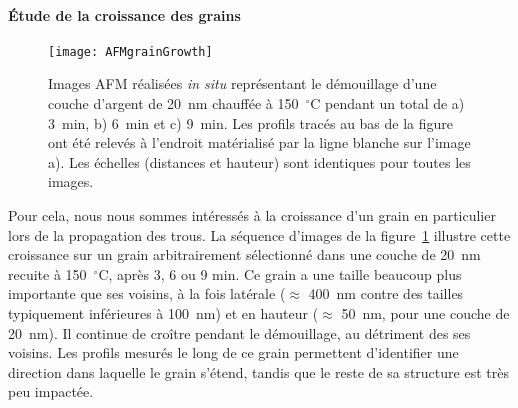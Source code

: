 \paragraph*{Étude de la croissance des grains}
\begin{figure}[h]
	\centering
	\texttt{[image: AFMgrainGrowth]}
	\caption{Images AFM réalisées \textit{in situ} représentant le démouillage d'une couche d'argent de 20~nm chauffée à 150~$^\circ$C pendant un total de a) 3~min, b) 6~min et c) 9~min. Les profils tracés au bas de la figure ont été relevés à l'endroit matérialisé par la ligne blanche sur l'image a). Les échelles (distances et hauteur) sont identiques pour toutes les images.}
	\label{AFMgrainGrowth}
\end{figure}

Pour cela, nous nous sommes intéressés à la croissance d'un grain en particulier lors de la propagation des trous. La séquence d'images de la figure~\ref{AFMgrainGrowth} illustre cette croissance sur un grain arbitrairement sélectionné dans une couche de 20~nm recuite à 150~$^\circ$C, après 3, 6 ou 9 min. Ce grain a une taille beaucoup plus importante que ses voisins, à la fois latérale ($\approx$ 400~nm contre des tailles typiquement inférieures à 100~nm) et en hauteur ($\approx$ 50~nm, pour une couche de 20~nm). Il continue de croître pendant le démouillage, au détriment des ses voisins. Les profils mesurés le long de ce grain permettent d'identifier une direction dans laquelle le grain s'étend, tandis que le reste de sa structure est très peu impactée.\par 

